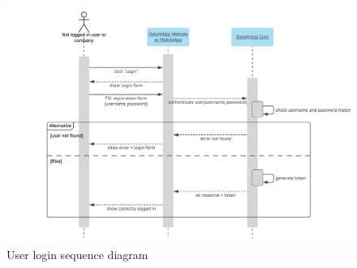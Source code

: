 \begin{figure}[H]
  \includegraphics[width=\textwidth,height=\textheight,keepaspectratio]{assets/sequence/UserLogin.pdf}
  \caption{User login sequence diagram}
  \label{fig:UserLogin}
\end{figure}






\newpage

